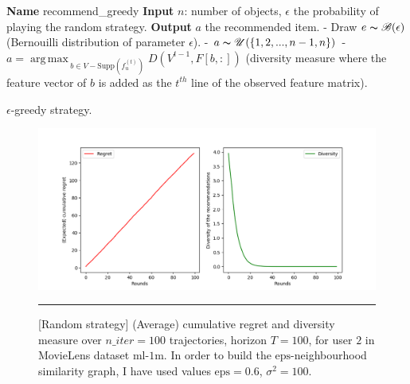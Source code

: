 \documentclass{article}
\DeclareMathOperator*{\argmax}{arg\,max\,}
\begin{document}
\begin{algorithm}
\begin{algorithmic}
\STATE \textbf{Name} recommend\_greedy
\STATE \textbf{Input} $n$: number of objects, $\epsilon$ the probability of playing the random strategy.
\STATE \textbf{Output} $a$ the recommended item.
\STATE - Draw $e \thicksim \mathscr{B}(\epsilon)$ (Bernouilli distribution of parameter $\epsilon$).
\STATE - $a \thicksim \mathscr{U}(\{1, 2, ..., n-1, n\})$
\ELSE
\STATE - $a = \argmax_{b \in V-\text{Supp}(f^{(t)}_{u})} D(V^{t-1}, F[b, :])$ (diversity measure where the feature vector of $b$ is added as the $t^{th}$ line of the observed feature matrix).
\ENDIF
\end{algorithmic}
\caption{$\epsilon$-greedy strategy.}
\label{greedy}
\end{algorithm}

\begin{figure}[H]
  \centering
  \rule[-.5cm]{0cm}{4cm}
  \includegraphics[scale=0.5]{../Results/random_4min40sec.png}
  \rule[-.5cm]{4cm}{0cm}
  \caption{[Random strategy] (Average) cumulative regret and diversity measure over $n\_iter=100$ trajectories, horizon $T=100$, for user $2$ in MovieLens dataset $\text{ml-1m}$. In order to build the $\text{eps}$-neighbourhood similarity graph, I have used values $\text{eps}=0.6$, $\sigma^{2}=100$.}
\label{figrandom}
\end{figure}
\end{document}
